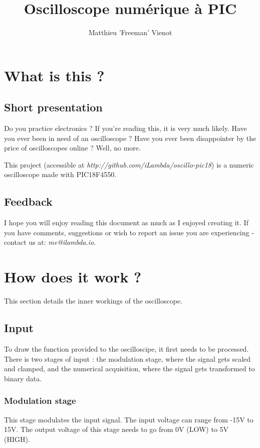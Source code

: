 \documentclass[11pt]{article}
\title{\textbf{Oscilloscope numérique à PIC}}
\author{Matthieu 'Freeman' Vienot}
\date{}
\begin{document}
\maketitle

\section{What is this ?}
\subsection {\Large\bfseries{Short presentation}}
Do you practice electronics ? If you're reading this, it is very much likely. Have you ever been in need of an oscilloscope ? Have you ever been disappointer by the price of oscilloscopes online ? Well, no more.

This project (accessible at \emph{http://github.com/iLambda/oscillo-pic18}) is a numeric oscilloscope made with PIC18F4550.

\subsection{Feedback}
I hope you will enjoy reading this document as much as I enjoyed creating it. If you have comments, suggestions or wish to report an issue you are experiencing - contact us at: \emph{me@ilambda.io}.

\section {How does it work ?}

This section details the inner workings of the oscilloscope.

\subsection{Input}

To draw the function provided to the oscilloscipe, it first needs to be processed. There is two stages of input : the modulation stage, where the signal gets scaled and clamped, and the numerical acquisition, where the signal gets transformed to binary data.

\subsubsection{Modulation stage}

This stage modulates the input signal. The input voltage can range from -15V to 15V. The output voltage of this stage needs to go from 0V (LOW) to 5V (HIGH).
\end{document}
